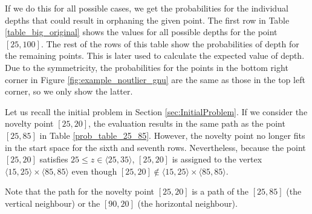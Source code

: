 If we do this for all possible cases, we get the probabilities for the individual depths that could result in orphaning the given point. The first row in Table \ref{table_big_original} shows the values for all possible depths for the point $[25,100]$. 
The rest of the rows of this table show the probabilities of depth for the remaining points.
This is later used to calculate the expected value of depth.
Due to the symmetricity, the probabilities for the points in the bottom right corner in Figure \ref{fig:example_noutlier_gnu} are the same as those in the top left corner, so we only show the latter.

Let us recall the initial problem in Section \ref{sec:InitialProblem}.
If we consider the novelty point $[25,20]$, the evaluation results in the same path as the point $[25,85]$ in Table \ref{prob_table_25_85}. However, the novelty point no longer fits in the start space for the sixth and seventh rows. Nevertheless, because the point $[25,20]$ satisfies $25 \le z \in \langle 25, 35 \rangle$,  $[25,20]$ is assigned to the vertex $\langle 15, 25 \rangle \times \langle 85, 85 \rangle$ even though $[25,20] \notin \langle 15, 25 \rangle \times \langle 85, 85 \rangle$.

Note that the path for the novelty point $[25,20]$ is a path of the $[25,85]$ (the vertical neighbour) or the $[90,20]$ (the horizontal neighbour).



